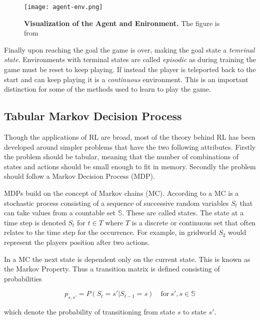\begin{figure}[H]
    \centering
    \texttt{[image: agent-env.png]}
    \captionsetup{width=.5\textwidth}
    \caption{\textbf{Visualization of the Agent and Enironment.} The figure is from \citep[p.~48]{sutton_barto_2018}}
    \label{fig:agent-env}

\end{figure}


Finally upon reaching the goal the game is over, making the goal state a \textit{temrinal state}. Environments with terminal states are called \textit{episodic} as during training the game must be reset to keep playing. If instead the player is teleported back to the start and can keep playing it is a \textit{continuous} environment. This is an important distinction for some of the methods used to learn to play the game.

\subsection{Tabular Markov Decision Process}

Though the applications of RL are broad, most of the theory behind RL has been developed around simpler problems that have the two following attributes. Firstly the problem should be tabular, meaning that the number of combinations of states and actions should be small enough to fit in memory. Secondly the problem should follow a Markov Decision Process (MDP). \cite[p.~23]{barto_sutton_1983}\citep[p.~57]{powell_2011} 

MDPs build on the concept of Markov chains (MC). According to \cite{ross_2014} a MC is a stochastic process consisting of a sequence of successive random variables $S_t$ that can take values from a countable set $\mathbb{S}$. These are called states. The state at a time step is denoted $S_t$ for $t \in T$ where $T$ is a discrete or continuous set that often relates to the time step for the occurrence. For example, in gridworld $S_2$ would represent the players position after two actions.

In a MC the next state is dependent only on the current state. This is known as the Markov Property. Thus a transition matrix is defined consisting of probabilities

\begin{equation}
    p_{s,s'} = P(S_t=s'|S_{t-1}=s) \quad \text{for} ~ s',s \in \mathbb{S}
\end{equation}

which denote the probability of transitioning from state $s$ to state $s'$.

